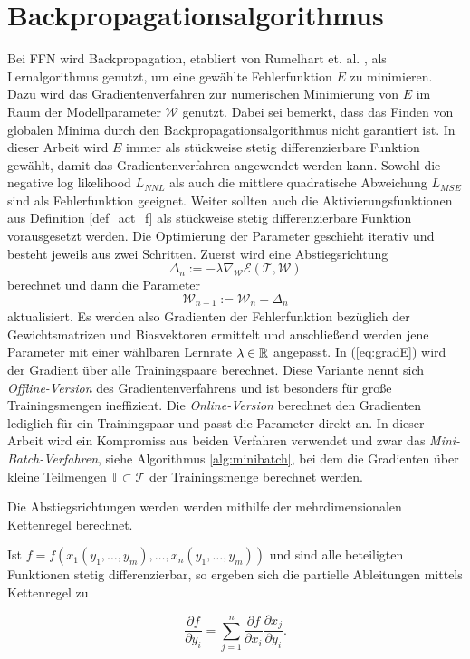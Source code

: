  \section*{Backpropagationsalgorithmus}
Bei FFN wird Backpropagation, etabliert von Rumelhart et. al. \cite{MLPbook}, als Lernalgorithmus genutzt, um eine gewählte Fehlerfunktion $E$ zu minimieren. Dazu wird das Gradientenverfahren zur numerischen Minimierung von $E$ im Raum der Modellparameter $\mathcal{W}$ genutzt. Dabei sei bemerkt, dass das Finden von globalen Minima durch den Backpropagationsalgorithmus nicht garantiert ist.
In dieser Arbeit wird $E$ immer als stückweise stetig differenzierbare Funktion gewählt, damit das Gradientenverfahren angewendet werden kann. Sowohl die negative log likelihood $L_{NNL}$ als auch die mittlere quadratische Abweichung $L_{MSE}$ sind als Fehlerfunktion geeignet. Weiter sollten auch die Aktivierungsfunktionen aus Definition \ref{def_act_f} als stückweise stetig differenzierbare Funktion vorausgesetzt werden. 
Die Optimierung der Parameter geschieht iterativ und besteht jeweils aus zwei Schritten. Zuerst wird eine Abstiegsrichtung 
\begin{equation}
    \label{eq:gradE}
    \Delta_n :=- \lambda \nabla_{\mathcal{W}} \mathcal{E}(\mathcal{T},\mathcal{W})
\end{equation} 
berechnet und dann die Parameter 
\begin{equation}
    \label{eq:step}
    \mathcal{W}_{n+1}:=\mathcal{W}_n+ \Delta_n
\end{equation}
aktualisiert. Es werden also Gradienten der Fehlerfunktion bezüglich der Gewichtsmatrizen und Biasvektoren ermittelt und anschließend werden jene Parameter mit einer wählbaren Lernrate $\lambda \in \mathbb{R}$ angepasst. In (\ref{eq:gradE}) wird der Gradient über alle Trainingspaare berechnet. Diese Variante nennt sich \textit{Offline-Version} des Gradientenverfahrens und ist besonders für große Trainingsmengen ineffizient. Die \textit{Online-Version} berechnet den Gradienten lediglich für ein Trainingspaar und passt die Parameter direkt an. In dieser Arbeit wird ein Kompromiss aus beiden Verfahren verwendet und zwar das \textit{Mini-Batch-Verfahren}, siehe Algorithmus \ref{alg:minibatch}, bei dem die Gradienten über kleine Teilmengen $\mathbb{T} \subset \mathcal{T}$ der Trainingsmenge berechnet werden.

Die Abstiegsrichtungen werden werden mithilfe der mehrdimensionalen Kettenregel  berechnet.
\begin{satz}
    \label{s:chainrule}
    Ist $f=f(x_1(y_1, \ldots, y_m), \ldots, x_n(y_1, \ldots, y_m))$ und sind alle beteiligten Funktionen stetig differenzierbar, so ergeben sich die partielle Ableitungen mittels Kettenregel zu

    \begin{equation*}
        \frac{\partial f}{\partial y_i}=\sum_{j=1}^n \frac{\partial f}{\partial x_i} \frac{\partial x_j}{\partial y_i} .
    \end{equation*}
\end{satz}

